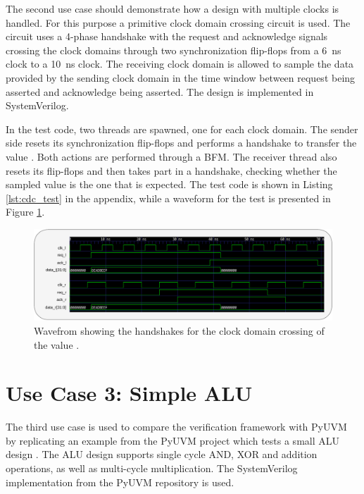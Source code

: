 The second use case should demonstrate how a design with multiple clocks is handled. For this purpose a primitive clock domain crossing circuit is used. The circuit uses a 4-phase handshake with the request and acknowledge signals crossing the clock domains through two synchronization flip-flops from a \SI{6}{ns} clock to a \SI{10}{ns} clock. The receiving clock domain is allowed to sample the data provided by the sending clock domain in the time window between request being asserted and acknowledge being asserted. The design is implemented in SystemVerilog. 

In the test code, two threads are spawned, one for each clock domain. The sender side resets its synchronization flip-flops and performs a handshake to transfer the value . Both actions are performed through a BFM. The receiver thread also resets its flip-flops and then takes part in a handshake, checking whether the sampled value is the one that is expected. The test code is shown in Listing \ref{lst:cdc_test} in the appendix, while a waveform for the test is presented in Figure \ref{fig:cdc_timing}.

\begin{figure}[t]
  \centering
  \includegraphics[width=\textwidth]{diagrams/cdc_timing.pdf}
  \caption{Wavefrom showing the handshakes for the clock domain crossing of the value .}
  \label{fig:cdc_timing}
  \end{figure}

\section{Use Case 3: Simple ALU} %

The third use case is used to compare the verification framework with PyUVM by replicating an example from the PyUVM project which tests a small ALU design \cite{pyuvm_tinyalu}. The ALU design supports single cycle AND, XOR and addition operations, as well as multi-cycle multiplication. The SystemVerilog implementation from the PyUVM repository is used. 

